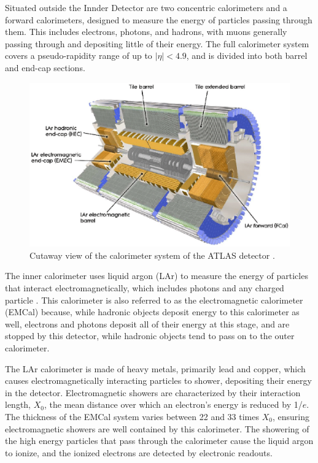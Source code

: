 Situated outside the Innder Detector are two concentric calorimeters and a forward calorimeters, designed to measure the energy of particles passing through them. This includes electrons, photons, and hadrons, with muons generally passing through and depositing little of their energy. The full calorimeter system covers a pseudo-rapidity range of up to $|\eta|<4.9$, and is divided into both barrel and end-cap sections.

\begin{figure}[H]
\centering
   \includegraphics[width=0.9\linewidth]{figures/lhc/calorimeter.eps}
\caption{Cutaway view of the calorimeter system of the ATLAS detector \cite{caloFig}.}
\label{fig:calo}
\end{figure}

The inner calorimeter uses liquid argon (LAr) to measure the  energy of particles that interact electromagnetically, which includes photons and any charged particle \cite{LARG-2009-01}. This calorimeter is also referred to as the electromagnetic calorimeter (EMCal) because, while hadronic objects deposit energy to this calorimeter as well, electrons and photons deposit all of their energy at this stage, and are stopped by this detector, while hadronic objects tend to pass on to the outer calorimeter. 

The LAr calorimeter is made of heavy metals, primarily lead and copper, which causes electromagnetically interacting particles to shower, depositing their energy in the detector. Electromagnetic showers are characterized by their interaction length, $X_0$, the mean distance over which an electron's energy is reduced by 1/$e$. The thickness of the EMCal system varies between 22 and 33 times $X_0$, ensuring electromagnetic showers are well contained by this calorimeter. The showering of the high energy particles that pass through the calorimeter cause the liquid argon to ionize, and the ionized electrons are detected by electronic readouts. 

